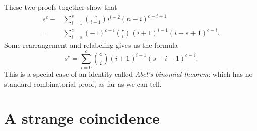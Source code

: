 \documentclass[table, dvipsnames]{beamer}
\begin{document}
\begin{frame}
    These two proofs together show that \begin{align*}s^c-&\sum_{i=1}^s \binom{c}{i-1}i^{i-2}(n-i)^{c-i+1}\\=&\sum_{i=s}^{c} (-1)^{c - i} \binom{c}{i}(i+1)^{i-1}(i - s + 1)^{c-i}.\end{align*} Some rearrangement and relabeling gives us the formula $$s^c=\sum_{i=0}^c \binom{c}{i}(i+1)^{i-1}(s-i-1)^{c-i}.$$ This is a special case of an identity called \textit{Abel's binomial theorem}: which has no standard combinatorial proof, as far as we can tell.
\end{frame}

\section{A strange coincidence}
\end{document}
